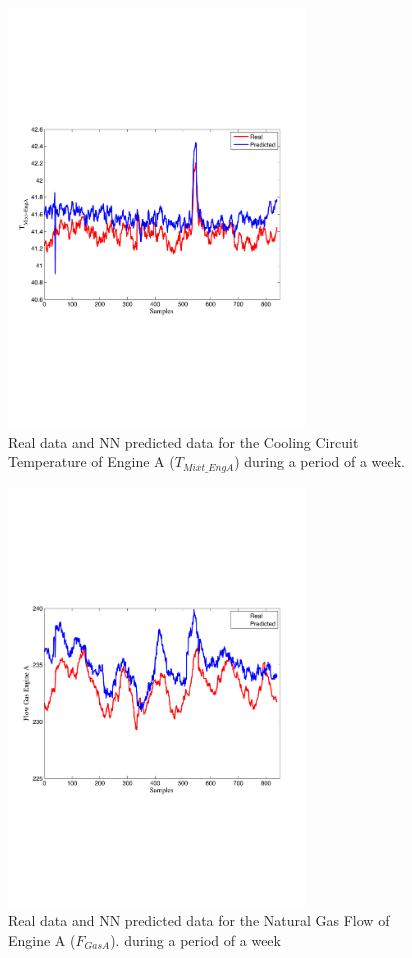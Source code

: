 \begin{figure}
\centering
\includegraphics[width=0.7\textwidth]{nna0bis.pdf}
\caption{Real data and NN predicted data for the Cooling Circuit Temperature of Engine A ($T_{Mixt\_EngA}$) during a period of a week.}
\label{TcoolA}
\end{figure}

\begin{figure}
\centering
\includegraphics[width=0.7\textwidth]{nna1bis.pdf}
\caption{Real data and NN predicted data for the Natural Gas Flow  of Engine A ($F_{GasA}$). during a period of a week}
\label{FengineA}
\end{figure}

